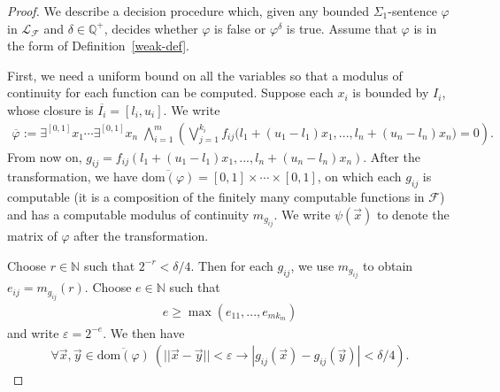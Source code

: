 \documentclass[prodmode]{acmsmall} %
\newcommand{\dom}{\mathrm{dom}}
\begin{document}
\begin{proof}
We describe a decision procedure which, given any bounded $\Sigma_1$-sentence $\varphi$ in $\mathcal{L}_{\mathcal{F}}$ and $\delta\in \mathbb{Q}^+$, decides whether $\varphi$ is false or $\varphi^{\delta}$ is true. Assume that $\varphi$ is in the form of Definition~\ref{weak-def}. 

First, we need a uniform bound on all the variables so that a modulus of continuity for each function can be computed. Suppose each $x_i$ is bounded by $I_i$, whose closure is $\overline{I_i} = [l_i, u_i]$. We write %
\begin{eqnarray*}
\overline{\varphi} :=  \exists^{[0,1]} x_1 \cdots \exists^{[0,1]} x_n\; \bigwedge_{i=1}^m(\bigvee_{j=1}^{k_i} f_{ij}\big(l_1+(u_1-l_1)x_1,...,l_n+(u_n-l_n)x_n\big)=0).
\end{eqnarray*}
From now on, $g_{ij} = f_{ij}(l_1+(u_1-l_1)x_1,...,l_n+(u_n-l_n)x_n)$. After the transformation, we have $\overline{\dom(\varphi)} = [0,1]\times\cdots\times [0,1]$, on which each $g_{ij}$ is computable (it is a composition of the finitely many computable functions in $\mathcal{F}$) and has a computable modulus of continuity $m_{g_{ij}}$. We write $\psi(\vec x)$ to denote the matrix of $\varphi$ after the transformation. 

Choose $r\in \mathbb{N}$ such that $2^{-r}<\delta/4$. Then for each $g_{ij}$, we use $m_{g_{ij}}$ to obtain $e_{ij} = m_{g_{ij}}(r)$. Choose $e\in \mathbb{N}$ such that 
\begin{eqnarray}\label{e-def}
e\geq\max(e_{11},...,e_{mk_m})
\end{eqnarray} and write $\varepsilon = 2^{-e}$. We then have
\begin{eqnarray}\label{first}
\forall \vec x, \vec y\in \overline{\dom(\varphi)}\  (||\vec x-\vec y||<\varepsilon \rightarrow |g_{ij}(\vec x)-g_{ij}(\vec y)|<{\delta}/{4}).
\end{eqnarray}


\end{proof}
\end{document}
